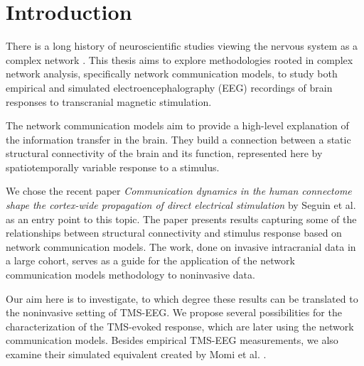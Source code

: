 \chapter*{Introduction}

There is a long history of neuroscientific studies viewing the nervous system as a complex network \cite{sporns_structure_2013}. This thesis aims to explore methodologies rooted in complex network analysis, specifically network communication models, to study both empirical and simulated electroencephalography (EEG) recordings of brain responses to transcranial magnetic stimulation. 

The network communication models aim to provide a high-level explanation of the information transfer in the brain. They build a connection between a static structural connectivity of the brain and its function, represented here by spatiotemporally variable response to a stimulus. 

We chose the recent paper \textit{Communication dynamics in the human connectome shape the cortex-wide propagation of direct electrical stimulation} by Seguin et al. \cite{seguin_communication_2023} as an entry point to this topic. The paper presents results capturing some of the relationships between structural connectivity and stimulus response based on network communication models. The work, done on invasive intracranial data in a large cohort, serves as a guide for the application of the network communication models methodology to noninvasive data. 

Our aim here is to investigate, to which degree these results can be translated to the noninvasive setting of TMS-EEG. We propose several possibilities for the characterization of the TMS-evoked response, which are later using the network communication models. Besides empirical TMS-EEG measurements, we also examine their simulated equivalent created by Momi et al. \cite{momi_tms-evoked_2023}.


